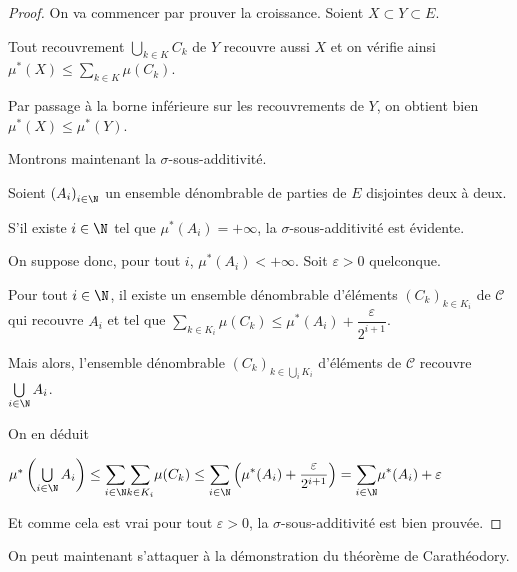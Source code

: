 \begin{proof}
On va commencer par prouver la croissance. Soient $X \subset Y  \subset E$.

Tout recouvrement $\bigcup \limits_{k \in K} C_k$ de $Y$ recouvre aussi $X$ et on vérifie ainsi $\mu^{*}(X) \leq \displaystyle{\sum \limits_{k \in K}}\mu(C_k)$.

Par passage à la borne inférieure sur les recouvrements de $Y$, on obtient bien  $\mu^{*}(X) \leq \mu^{*}(Y)$.

Montrons maintenant la $\sigma$-sous-additivité.

Soient $\left(A_i\right)_{i \in \N}$ un ensemble dénombrable de parties de $E$ disjointes deux à deux. 

S'il existe $i \in \N$ tel que $\mu^{*}(A_i) = +\infty$, la $\sigma$-sous-additivité est évidente. 

On suppose donc, pour tout $i$, $\mu^{*}(A_i)<+\infty$. Soit $\varepsilon > 0$ quelconque. 

Pour tout $i \in \N$, il existe un ensemble dénombrable d'éléments $\left(C_{k}\right)_{k \in K_i}$ de $\mathcal{C}$ qui recouvre $A_i$ et tel que $\displaystyle{\sum \limits_{k \in K_i}}\mu(C_k) \leq \mu^{*}(A_i) + \dfrac{\varepsilon}{2^{i+1}}$.

Mais alors, l'ensemble dénombrable $\left(C_k\right)_{k \in \bigcup \limits_{i} K_i}$ d'éléments de $\mathcal{C}$ recouvre $\bigcup \limits_{i \in \N} A_i$.

On en déduit

$
\mu^{*}\left(\bigcup \limits_{i \in \N} A_i\right) \leq \displaystyle{\sum \limits_{i \in \N}}\displaystyle{\sum \limits_{k \in K_i}}\mu(C_k) \leq \displaystyle{\sum \limits_{i \in \N}} \left(\mu^{*}(A_i) + \dfrac{\varepsilon}{2^{i+1}}\right) = \displaystyle{\sum \limits_{i \in \N}} \mu^{*}(A_i) + \varepsilon
$

Et comme cela est vrai pour tout $\varepsilon > 0$, la $\sigma$-sous-additivité est bien prouvée.
\end{proof}

On peut maintenant s'attaquer à la démonstration du théorème de Carathéodory.

